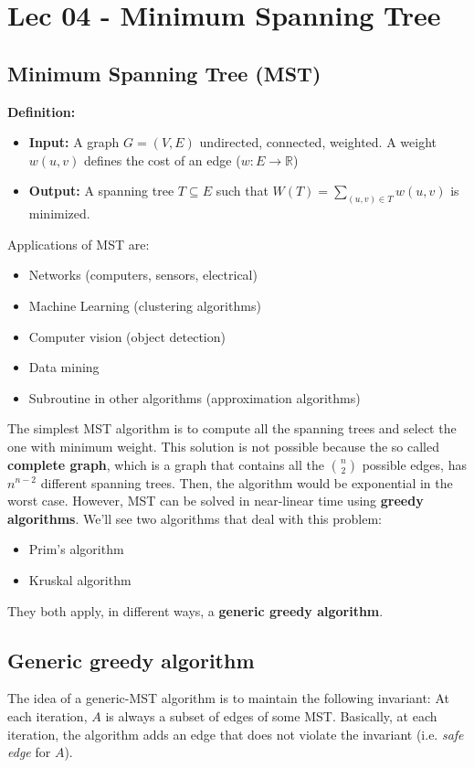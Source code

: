 \chapter{Lec 04 - Minimum Spanning Tree}

\section{Minimum Spanning Tree (MST)}
\textbf{Definition:}\newline
\begin{itemize}
    \item \textbf{Input:} A graph $G = (V, E)$ undirected, connected, weighted. A weight $w(u, v)$ defines the cost of an edge ($w: E \rightarrow \mathbb{R}$)

    \item \textbf{Output:} A spanning tree $T \subseteq E$ such that $W(T) = \sum_{(u,v) \in T}w(u, v)$ is minimized.
\end{itemize}

Applications of MST are:
\begin{itemize}
    \item Networks (computers, sensors, electrical)
    \item Machine Learning (clustering algorithms)
    \item Computer vision (object detection)
    \item Data mining
    \item Subroutine in other algorithms (approximation algorithms)
\end{itemize}
The simplest MST algorithm is to compute all the spanning trees and select the one with minimum weight. This solution is not possible because the so called \textbf{complete graph}, which is a graph that contains all the $\binom{n}{2}$ possible edges, has $n^{n-2}$ different spanning trees. Then, the algorithm would be exponential in the worst case. \newline\newline
However, MST can be solved in near-linear time using \textbf{greedy algorithms}. We'll see two algorithms that deal with this problem:
\begin{itemize}
    \item Prim's algorithm
    \item Kruskal algorithm
\end{itemize}
They both apply, in different ways, a \textbf{generic greedy algorithm}.

\section{Generic greedy algorithm}
The idea of a generic-MST algorithm is to maintain the following invariant: At each iteration, $A$ is always a subset of edges of some MST. Basically, at each iteration, the algorithm adds an edge that does not violate the invariant (i.e. \textit{safe edge} for $A$).\newline\newline


